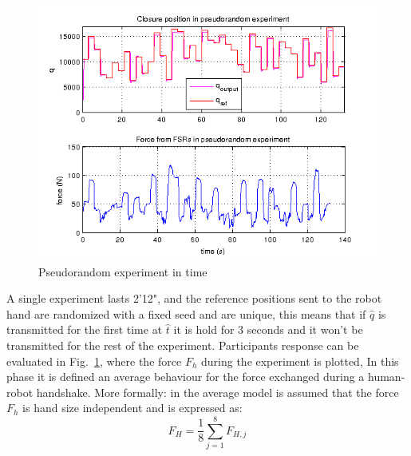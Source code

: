 \begin{figure}[h]
  \centering
\includegraphics[width=\textwidth]{Figure/pseudorandom_q.png}
  \caption{Pseudorandom experiment in time}
  \label{Fig:pseudo}
\end{figure}


A single experiment lasts 2'12", and the reference positions sent to the robot hand are randomized with a fixed seed and are unique, this means that if $\hat{q}$ is transmitted for the first time at $\hat{t}$ it is hold for 3 seconds and it won't be transmitted for the rest of the experiment.
Participants response can be evaluated in Fig.~\ref{Fig:pseudo}, where the force $F_{h}$ during the experiment is plotted, 
In this phase it is defined an average behaviour for the force exchanged during a human-robot handshake. More formally: in the average model is assumed that the force $F_{h}$ is hand size independent and is expressed as:
%
\begin{equation}
F_{H}= \frac{1}{8} \sum_{j=1}^{8} F_{H,j} 
\end{equation}

%

